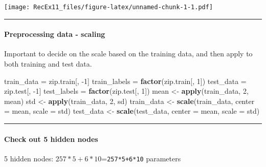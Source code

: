 \documentclass[]{article}
\newenvironment{Shaded}{\begin{snugshade}}{\end{snugshade}}
\newcommand{\KeywordTok}[1]{\textcolor[rgb]{0.13,0.29,0.53}{\textbf{#1}}}
\newcommand{\DataTypeTok}[1]{\textcolor[rgb]{0.13,0.29,0.53}{#1}}
\newcommand{\DecValTok}[1]{\textcolor[rgb]{0.00,0.00,0.81}{#1}}
\newcommand{\StringTok}[1]{\textcolor[rgb]{0.31,0.60,0.02}{#1}}
\newcommand{\NormalTok}[1]{#1}
\let\oldparagraph\paragraph
\renewcommand{\paragraph}[1]{\oldparagraph{#1}\mbox{}}
\begin{document}
\texttt{[image: RecEx11\_files/figure-latex/unnamed-chunk-1-1.pdf]}

\begin{center}\rule{0.5\linewidth}{\linethickness}\end{center}

\paragraph{Preprocessing data -
scaling}\label{preprocessing-data---scaling}

Important to decide on the scale based on the training data, and then
apply to both training and test data.

\begin{Shaded}
\begin{Highlighting}[]
\NormalTok{train_data =}\StringTok{ }\NormalTok{zip.train[, }\DecValTok{-1}\NormalTok{]}
\NormalTok{train_labels =}\StringTok{ }\KeywordTok{factor}\NormalTok{(zip.train[, }\DecValTok{1}\NormalTok{])}
\NormalTok{test_data =}\StringTok{ }\NormalTok{zip.test[, }\DecValTok{-1}\NormalTok{]}
\NormalTok{test_labels =}\StringTok{ }\KeywordTok{factor}\NormalTok{(zip.test[, }\DecValTok{1}\NormalTok{])}
\NormalTok{mean <-}\StringTok{ }\KeywordTok{apply}\NormalTok{(train_data, }\DecValTok{2}\NormalTok{, mean)}
\NormalTok{std <-}\StringTok{ }\KeywordTok{apply}\NormalTok{(train_data, }\DecValTok{2}\NormalTok{, sd)}
\NormalTok{train_data <-}\StringTok{ }\KeywordTok{scale}\NormalTok{(train_data, }\DataTypeTok{center =}\NormalTok{ mean, }\DataTypeTok{scale =}\NormalTok{ std)}
\NormalTok{test_data <-}\StringTok{ }\KeywordTok{scale}\NormalTok{(test_data, }\DataTypeTok{center =}\NormalTok{ mean, }\DataTypeTok{scale =}\NormalTok{ std)}
\end{Highlighting}
\end{Shaded}

\begin{center}\rule{0.5\linewidth}{\linethickness}\end{center}

\paragraph{Check out 5 hidden nodes}\label{check-out-5-hidden-nodes}

5 hidden nodes: \(257*5+6*10\)=\texttt{257*5+6*10} parameters
\end{document}

